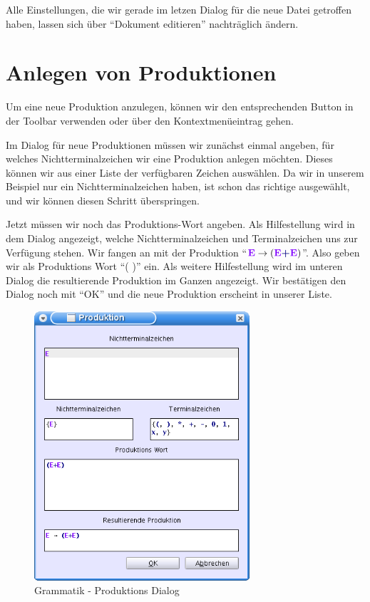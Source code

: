 Alle Einstellungen, die wir gerade im letzen Dialog für die neue Datei getroffen
haben, lassen sich über "`Dokument editieren"' nachträglich ändern.

\section{Anlegen von Produktionen}

Um eine neue Produktion anzulegen, können wir den entsprechenden Button in der
Toolbar verwenden oder über den Kontextmenüeintrag gehen.\vspace{10pt}

Im Dialog für neue Produktionen müssen wir zunächst einmal angeben, für welches
Nichtterminalzeichen wir eine Produktion anlegen möchten. Dieses können wir aus
einer Liste der verfügbaren Zeichen auswählen. Da wir in unserem Beispiel nur
ein Nichtterminalzeichen haben, ist schon das richtige ausgewählt, und wir
können diesen Schritt überspringen.\vspace{10pt}

Jetzt müssen wir noch das Produktions-Wort angeben. Als Hilfestellung wird in
dem Dialog angezeigt, welche Nichtterminalzeichen und Terminalzeichen uns zur
Verfügung stehen. Wir fangen an mit der Produktion "`$\StartSymbol{E} \to
(\StartSymbol{E} \TerminalSymbol{+} \StartSymbol{E})$"'. Also geben wir als
Produktions Wort "`( \TerminalSymbol{+} )"' ein.
Als weitere Hilfestellung wird im unteren Dialog die resultierende Produktion im
Ganzen angezeigt. Wir bestätigen den Dialog noch mit "`OK"' und die neue
Produktion erscheint in unserer Liste.\vspace{10pt}

\begin{figure}[h]
\begin{center}
\includegraphics[width=8cm]{../images/production_dialog.png}
\caption{Grammatik - Produktions Dialog}
\end{center}
\end{figure}

